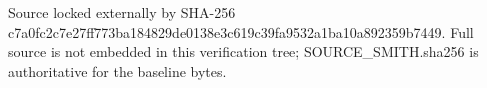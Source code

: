 Source locked externally by SHA-256 c7a0fc2c7e27ff773ba184829de0138e3c619c39fa9532a1ba10a892359b7449. Full source is not embedded in this verification tree; SOURCE_SMITH.sha256 is authoritative for the baseline bytes.
